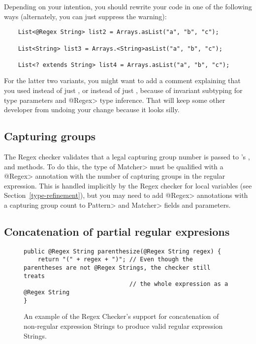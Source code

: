 Depending on your intention, you should rewrite your code in one of the
following ways (alternately, you can just suppress the warning):

\begin{Verbatim}
    List<@Regex String> list2 = Arrays.asList("a", "b", "c");

    List<String> list3 = Arrays.<String>asList("a", "b", "c");

    List<? extends String> list4 = Arrays.asList("a", "b", "c");
\end{Verbatim}

\noindent
For the latter two variants, you might want to add a comment explaining
that you used  instead of just , or
 instead of just , because
of invariant subtyping for type parameters and \<@Regex> type inference.
That will keep some other developer from undoing your change because it
looks silly.


\subsection{Capturing groups\label{regex-capturing-groups}}

The Regex checker validates that a legal capturing group number is passed
to 's
,
 and
 methods. To do this,
the type of \<Matcher> must be qualified with a \<@Regex> annotation
with the number of capturing groups in the regular expression. This is
handled implicitly by the Regex checker for local variables (see
Section~\ref{type-refinement}), but you may need to add \<@Regex> annotations
with a capturing group count to \<Pattern> and \<Matcher> fields and
parameters.


\subsection{Concatenation of partial regular expresions\label{regex-partial-regex}}

\begin{figure}
\begin{Verbatim}
public @Regex String parenthesize(@Regex String regex) {
    return "(" + regex + ")"; // Even though the parentheses are not @Regex Strings, the checker still treats
                              // the whole expression as a @Regex String
}
\end{Verbatim}
\caption{An example of the Regex Checker's support for concatenation
of non-regular expression Strings to produce valid regular expression Strings.}
\label{fig:regex-partial}
\end{figure}

